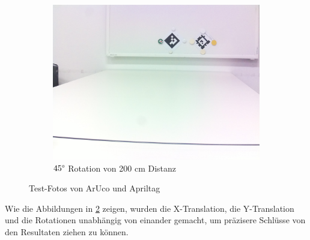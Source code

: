 \begin{figure}[H]
\begin{subfigure}[h]{0.45\textwidth}
    \end{subfigure}
    \begin{subfigure}[h]{0.45\textwidth}
        \centering
        \includegraphics[width=\linewidth]{graphics/200_rotation.jpg}
        \caption{\(45\degree\) Rotation von 200 cm Distanz}
        \label{fig:Test200}
    \end{subfigure}
    \caption{Test-Fotos von ArUco und Apriltag}
\label{fig:TestFotos}
\end{figure}

Wie die Abbildungen in \ref{fig:TestFotos} zeigen, wurden die X-Translation, die Y-Translation und die Rotationen
unabhängig von einander gemacht, um präzisere Schlüsse von den Resultaten ziehen zu können.



